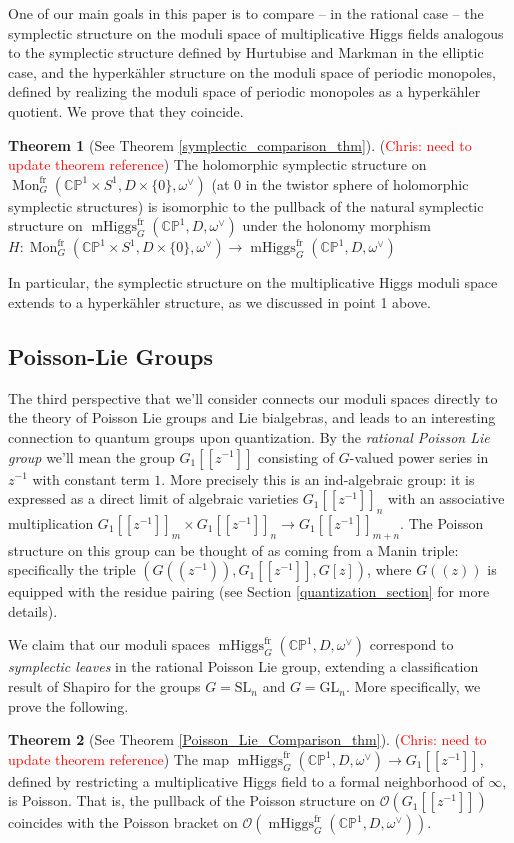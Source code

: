 \documentclass[11pt, oneside, reqno]{amsart}
\theoremstyle{definition} \newtheorem{definition}{Definition}[section]
\newtheorem{theorem}[definition]{Theorem}
\theoremstyle{definition} \newtheorem{remark}[definition]{Remark}
\theoremstyle{definition} \newtheorem{remarks}[definition]{Remarks}
\theoremstyle{definition} \newtheorem{question}[definition]{Question}
\theoremstyle{definition} \newtheorem*{note}{Note}
\theoremstyle{definition} \newtheorem{example}[definition]{Example}
\theoremstyle{definition} \newtheorem{examples}[definition]{Examples}
\newcommand{\bb}[1]{\mathbb{#1}}
\newcommand{\OO}{\mathcal{O}}
\newcommand{\SL}{\mathrm{SL}}
\newcommand{\GL}{\mathrm{GL}}
\DeclareMathOperator{\mhiggs}{mHiggs}
\DeclareMathOperator{\mon}{Mon}
\newcommand{\fr}{\mathrm{fr}}
\newcommand{\chris}[1]{(\textcolor{red}{Chris: #1})}
\begin{document}
One of our main goals in this paper is to compare -- in the rational case -- the symplectic structure on the moduli space of multiplicative Higgs fields analogous to the symplectic structure defined by Hurtubise and Markman in the elliptic case, and the hyperk\"ahler structure on the moduli space of periodic monopoles, defined by realizing the moduli space of periodic monopoles as a hyperk\"ahler quotient.  We prove that they coincide.

\begin{theorem}[See Theorem \ref{symplectic_comparison_thm}]
\chris{need to update theorem reference}
  The holomorphic symplectic structure on
  $\mon_G^\fr(\bb{CP}^1 \times S^1,D \times\{0\},\omega^\vee)$ (at 0
  in the twistor sphere of holomorphic symplectic structures) 
  is isomorphic to the pullback of the natural symplectic structure on
  $\mhiggs_G^{\text{fr}}(\bb{CP}^1,D,\omega^\vee)$ under the
  holonomy morphism $H \colon \mon_G^\fr(\bb{CP}^1 \times S^1,D \times\{0\},\omega^\vee) \to \mhiggs_G^{\text{fr}}(\bb{CP}^1,D,\omega^\vee)$  
\end{theorem}

In particular, the symplectic structure on the multiplicative Higgs moduli space extends to a hyperk\"ahler structure, as we discussed in point 1 above.

\subsection{Poisson-Lie Groups}
The third perspective that we'll consider connects our moduli spaces directly to the theory of Poisson Lie groups and Lie bialgebras, and leads to an interesting connection to quantum groups upon quantization.  By the \emph{rational Poisson Lie group} we'll mean the group $G_1[[z^{-1}]]$ consisting of $G$-valued power series in $z^{-1}$ with constant term $1$.  More precisely this is an ind-algebraic group: it is expressed as a direct limit of algebraic varieties $G_1[[z^{-1}]]_n$ with an associative multiplication $G_1[[z^{-1}]]_m \times G_1[[z^{-1}]]_n \to G_1[[z^{-1}]]_{m+n}$.  The Poisson structure on this group can be thought of as coming from a Manin triple: specifically the triple $(G(\!(z^{-1})\!), G_1[[z^{-1}]], G[z])$, where $G(\!(z)\!)$ is equipped with the residue pairing (see Section \ref{quantization_section} for more details).  

We claim that our moduli spaces $\mhiggs_G^{\text{fr}}(\bb{CP}^1,D,\omega^\vee)$ correspond to \emph{symplectic leaves} in the rational Poisson Lie group, extending a classification result of Shapiro \cite{Shapiro} for the groups $G = \SL_n$ and $G = \GL_n$.  More specifically, we prove the following.
\begin{theorem}[See Theorem \ref{Poisson_Lie_Comparison_thm}]
\chris{need to update theorem reference}
The map $\mhiggs^\fr_G(\bb{CP}^1,D,\omega^\vee) \to G_1[[z^{-1}]]$, defined by restricting a multiplicative Higgs field to a formal neighborhood of $\infty$, is Poisson.  That is, the pullback of the Poisson structure on $\OO(G_1[[z^{-1}]])$ coincides with the Poisson bracket on $\OO(\mhiggs^\fr_G(\bb{CP}^1,D,\omega^\vee))$. 
\end{theorem}
\end{document}
